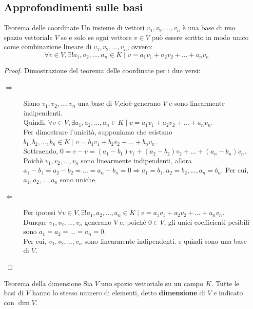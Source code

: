 \documentclass[a4paper]{article}
\theoremstyle{definition}
\begin{document}
\subsection{Approfondimenti sulle basi}
\begin{teo}{Teorema delle coordinate}{}
	Un insieme di vettori $v_1, v_2, ..., v_n$ è una base di uno spazio vettoriale $V$ se e solo se ogni vettore $v \in V$ può essere scritto in modo unico come combinazione lineare di $v_1, v_2, ..., v_n$, ovvero:
	\begin{equation*}
		\forall v \in V, \exists! a_1, a_2, ..., a_n \in K \mid v = a_1v_1 + a_2v_2 + ... + a_nv_n
	\end{equation*}
\end{teo}
\begin{proof}
	Dimostrazione del teorema delle coordinate per i due versi:
	\begin{description}
		\item[$\Rightarrow$] Siano $v_1, v_2, ..., v_n$ una base di $V$,cioè generano $V$ e sono linearmente indipendenti. \\
		      Quindi, $\forall v \in V, \exists a_1, a_2, ..., a_n \in K \mid v = a_1v_1 + a_2v_2 + ... + a_nv_n$. \\
		      Per dimostrare l'unicità, supponiamo che esistano $b_1, b_2, ..., b_n \in K \mid v = b_1v_1 + b_2v_2 + ... + b_nv_n$. \\
		      Sottraendo, $0 = v - v = (a_1 - b_1)v_1 + (a_2 - b_2)v_2 + ... + (a_n - b_n)v_n$. \\
		      Poichè $v_1, v_2, ..., v_n$ sono linearmente indipendenti, allora $a_1 - b_1 = a_2 - b_2 = ... = a_n - b_n = 0 \Rightarrow a_1 = b_1, a_2 = b_2, ..., a_n = b_n$.
		      Per cui, $a_1, a_2, ..., a_n$ sono uniche.
		\item[$\Leftarrow$] Per ipotesi $\forall v \in V, \exists! a_1, a_2, ..., a_n \in K \mid v = a_1v_1 + a_2v_2 + ... + a_nv_n$. \\
		      Dunque $v_1, v_2, ..., v_n$ generano $V$ e, poichè $0 \in V$, gli unici coefficienti pesibili sono $a_1 = a_2 = ... = a_n = 0$. \\
		      Per cui, $v_1, v_2, ..., v_n$ sono linearmente indipendenti. e quindi sono una base di $V$.
	\end{description}
\end{proof}
\begin{teo}{Teorema della dimensione}{}
	Sia $V$ uno spazio vettoriale su un campo $K$. Tutte le basi di $V$ hanno lo stesso numero di elementi, detto \textbf{dimensione} di $V$ e indicato con $\dim V$.
\end{teo}
\end{document}

